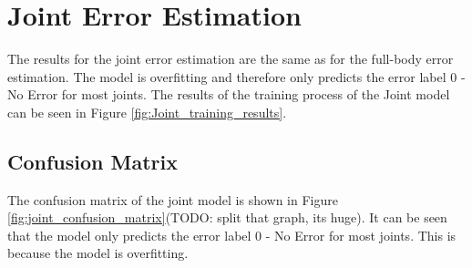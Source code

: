 \section{Joint Error Estimation}
\label{sec:joint_error_estimation}

The results for the joint error estimation are the same as for the full-body error estimation. The model is overfitting and therefore only predicts the error label $0$ - No Error for most joints. The results of the training process of the Joint model can be seen in Figure \ref{fig:Joint_training_results}.



\subsection{Confusion Matrix}

The confusion matrix of the joint model is shown in Figure \ref{fig:joint_confusion_matrix}(TODO: split that graph, its huge). It can be seen that the model only predicts the error label $0$ - No Error for most joints. This is because the model is overfitting.

